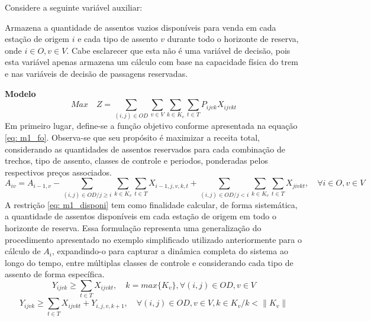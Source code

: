 Considere a seguinte variável auxiliar:
\begin{description}[style=unboxed, leftmargin=2.5cm, labelindent=1.5cm]
	\setlength{\itemsep}{-2.2em} %
	\setlength{\parskip}{0em} %
	\item[$A_{iv}:$] Armazena a quantidade de assentos vazios disponíveis para venda em cada estação de origem $i$ e cada tipo de assento $v$ durante todo o horizonte de reserva, onde $i \in O, v \in V$. Cabe esclarecer que esta não é uma variável de decisão, pois esta variável apenas armazena um cálculo com base na capacidade física do trem e nas variáveis de decisão de passagens reservadas.
\end{description}

\noindent \textbf{Modelo}
\begin{equation}
	Max \quad Z = \sum_{(i,j)\in OD} \sum_{v\in V} \sum_{k\in K_v} \sum_{t\in T} P_{ijvk} X_{ijvkt}           \label{eq: m1_fo}
\end{equation}
Em primeiro lugar, define-se a função objetivo conforme apresentada na equação \eqref{eq: m1_fo}. Observa-se que seu propósito é maximizar a receita total, considerando as quantidades de assentos reservados para cada combinação de trechos, tipo de assento, classes de controle e periodos, ponderadas pelos respectivos preços associados.
\begin{equation}
	A_{iv} = A_{i-1,v} - \sum_{(i,j) \in OD/j \geq i} \sum_{k\in K_v}\sum_{t\in T}X_{i-1,j,v,k,t} + \sum_{(i,j) \in OD/j<i} \sum_{k\in K_v}\sum_{t\in T}X_{jivkt}, \quad \forall i \in O, v \in V  \label{eq: m1_disponi}
\end{equation}
A restrição \eqref{eq: m1_disponi} tem como finalidade calcular, de forma sistemática, a quantidade de assentos disponíveis em cada estação de origem em todo o horizonte de reserva. Essa formulação representa uma generalização do procedimento apresentado no exemplo simplificado utilizado anteriormente para o cálculo de $A_{i}$, expandindo-o para capturar a dinâmica completa do sistema ao longo do tempo, entre múltiplas classes de controle e considerando cada tipo de assento de forma específica.
\begin{equation}
	Y_{ijvk} \geq  \sum_{t \in T} X_{ijvkt},  \quad k = max\{K_v\}, \forall(i,j) \in OD ,v \in V    \label{eq: m1_autho_mayor_assig_1er_class}
\end{equation}
\begin{equation}
	Y_{ijvk} \geq  \sum_{t \in T} X_{ijvkt} + Y_{i,j,v,k + 1} , \quad \forall(i,j) \in OD, v \in V, k \in K_v / k < \lVert K_v \rVert  \label{eq: m1_autho_mayor_assig_mas_autho}
\end{equation}
